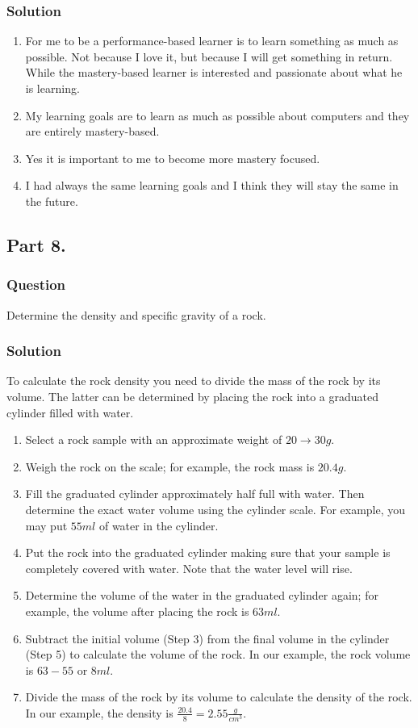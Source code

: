 \documentclass[a4paper, 10pt]{article}
\begin{document}
			\subsubsection{Solution}
				\begin{enumerate}[label=\alph*)]
					\item For me to be a performance-based learner is to learn something as much as possible. Not because I love it, but because I will get something in return. While the mastery-based learner is interested and passionate about what he is learning.
					\item My learning goals are to learn as much as possible about computers and they are entirely mastery-based.
					\item Yes it is important to me to become more mastery focused.
					\item I had always the same learning goals and I think they will stay the same in the future.
				\end{enumerate}
			
		\subsection{Part 8.}
			\subsubsection{Question}
				\noindent Determine the density and specific gravity of a rock.
			\subsubsection{Solution}
				\noindent To calculate the rock density you need to divide the mass of the rock by its volume. The latter can be determined by placing the rock into a graduated cylinder filled with water.
				\begin{enumerate}
					\item Select a rock sample with an approximate weight of $20 \rightarrow 30 g$.
					\item Weigh the rock on the scale; for example, the rock mass is $20.4 g$.
					\item Fill the graduated cylinder approximately half full with water. Then determine the exact water volume using the cylinder scale. For example, you may put $55 ml$ of water in the cylinder.
					\item Put the rock into the graduated cylinder making sure that your sample is completely covered with water. Note that the water level will rise.
					\item Determine the volume of the water in the graduated cylinder again; for example, the volume after placing the rock is $63 ml$.
					\item Subtract the initial volume (Step 3) from the final volume in the cylinder (Step 5) to calculate the volume of the rock. In our example, the rock volume is $63 - 55$ or $8 ml$.
					\item Divide the mass of the rock by its volume to calculate the density of the rock. In our example, the density is $\frac{20.4}{8} = 2.55 \frac{g}{cm^{3}}$.
				\end{enumerate}
			
\end{document}
